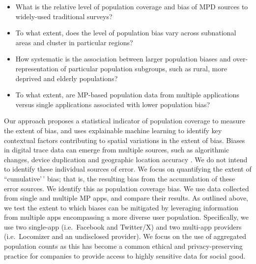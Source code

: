 \documentclass[]{rsos}%
\providecommand{\tightlist}{%
  \setlength{\itemsep}{0pt}\setlength{\parskip}{0pt}}
\begin{document}
\begin{itemize}
\tightlist
\item
  What is the relative level of population coverage and bias of MPD
  sources to widely-used traditional surveys?
\item
  To what extent, does the level of population bias vary across
  subnational areas and cluster in particular regions?
\item
  How systematic is the association between larger population biases
  and over-representation of particular population subgroups, such as
  rural, more deprived and elderly populations?
\item
  To what extent, are MP-based population data from multiple
  applications versus single applications associated with lower
  population bias?
\end{itemize}

Our approach proposes a statistical indicator of population coverage to
measure the extent of bias, and uses explainable machine learning to
identify key contextual factors contributing to spatial variations in
the extent of bias. Biases in digital trace data can emerge from
multiple sources, such as algorithmic changes, device duplication and
geographic location accuracy \citep{unstatsMPDMS2025}. We do not intend to
identify these individual sources of error. We focus on quantifying the
extent of ``cumulative'\,' bias; that is, the resulting bias from the
accumulation of these error sources. We identify this as population
coverage bias. We use data collected from single and multiple MP apps,
and compare their results. As outlined above, we test the extent to
which biases can be mitigated by leveraging information from multiple
apps encompassing a more diverse user population. Specifically, we use
two single-app (i.e.~Facebook and Twitter/X) and two multi-app providers
(i.e.~Locomizer and an undisclosed provider). We focus on the use of
aggregated population counts as this has become a common ethical and
privacy-preserving practice for companies to provide access to highly
sensitive data for social good.
\end{document}
